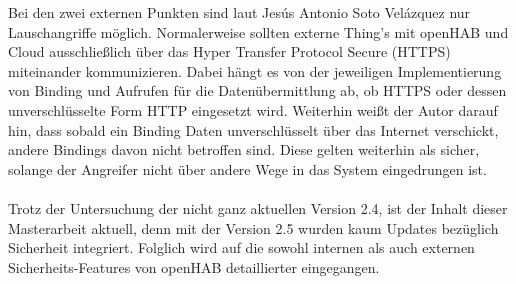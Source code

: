 Bei den zwei externen Punkten sind laut 
Jesús Antonio Soto Velázquez nur Lauschangriffe möglich. Normalerweise sollten externe Thing's mit openHAB und Cloud ausschließlich über das Hyper Transfer Protocol Secure (HTTPS) miteinander kommunizieren. Dabei hängt es von der jeweiligen Implementierung von Binding und Aufrufen für die Datenübermittlung ab, ob HTTPS oder dessen unverschlüsselte Form HTTP eingesetzt wird. Weiterhin weißt der Autor darauf hin, dass sobald ein Binding Daten unverschlüsselt über das Internet verschickt, andere Bindings davon nicht betroffen sind. Diese gelten weiterhin als sicher, solange der Angreifer nicht über andere Wege in das System eingedrungen ist.\\
\\
Trotz der Untersuchung der nicht ganz aktuellen Version 2.4, ist der Inhalt dieser Masterarbeit aktuell, denn mit der Version 2.5 wurden kaum Updates bezüglich Sicherheit integriert.\cite{openHAB02:OH} Folglich wird auf die sowohl internen als auch externen Sicherheits-Features von openHAB detaillierter eingegangen.

